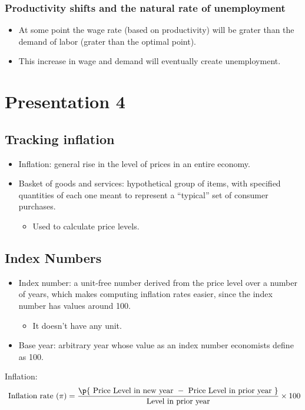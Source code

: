 \documentclass[openany]{book}
\begin{document}
\subsection{Productivity shifts and the natural rate of unemployment}
\begin{itemize}
    \item At some point the wage rate (based on productivity) will be grater than the demand of labor (grater than the optimal point).
    \item This increase in wage and demand will eventually create unemployment. 
\end{itemize}

\chapter{Presentation 4}
\section{Tracking inflation}
\begin{itemize}
    \item Inflation: general rise in the level of prices in an entire economy.  
    \item Basket of goods and services: hypothetical group of items, with specified quantities of each one meant to represent a ``typical'' set of consumer purchases.
        \begin{itemize}
            \item Used to calculate price levels. 
        \end{itemize}
\end{itemize}

\section{Index Numbers}
\begin{itemize}
    \item Index number: a unit-free number derived from the price level over a number of years, which makes computing inflation rates easier, since the index number has values around 100.
        \begin{itemize}
            \item It doesn't have any unit.
        \end{itemize}
    \item Base year: arbitrary year whose value as an index number economists define as 100.
\end{itemize}
Inflation: 
\[
  \text{ Inflation rate  }(\pi) = \frac{\p{\text{ Price Level in new year } - \text{ Price Level in prior year }} }{\text{ Level in prior year }} \times 100
\]
\end{document}
